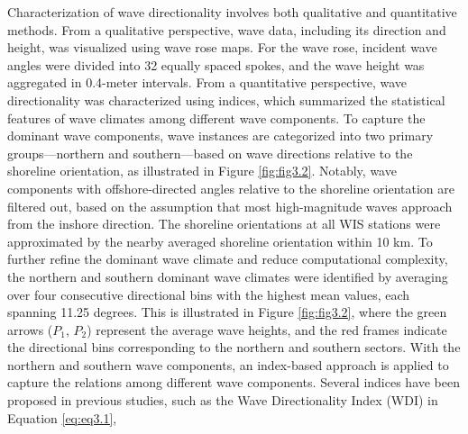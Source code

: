 Characterization of wave directionality involves both qualitative and quantitative methods. From a qualitative perspective, wave data, including its direction and height, was visualized using wave rose maps. For the wave rose, incident wave angles were divided into 32 equally spaced spokes, and the wave height was aggregated in 0.4-meter intervals. From a quantitative perspective, wave directionality was characterized using indices, which summarized the statistical features of wave climates among different wave components. To capture the dominant wave components, wave instances are categorized into two primary groups—northern and southern—based on wave directions relative to the shoreline orientation, as illustrated in Figure \ref{fig:fig3.2}. Notably, wave components with offshore-directed angles relative to the shoreline orientation are filtered out, based on the assumption that most high-magnitude waves approach from the inshore direction. The shoreline orientations at all WIS stations were approximated by the nearby averaged shoreline orientation within 10 km. To further refine the dominant wave climate and reduce computational complexity, the northern and southern dominant wave climates were identified by averaging over four consecutive directional bins with the highest mean values, each spanning 11.25 degrees. This is illustrated in Figure \ref{fig:fig3.2}, where the green arrows ($P_1$, $P_2$) represent the average wave heights, and the red frames indicate the directional bins corresponding to the northern and southern sectors. With the northern and southern wave components, an index-based approach is applied to capture the relations among different wave components. Several indices have been proposed in previous studies, such as the Wave Directionality Index (WDI) \citep{wiggins_coastal_2019,wiggins_regionally-coherent_2019} in Equation \ref{eq:eq3.1},

